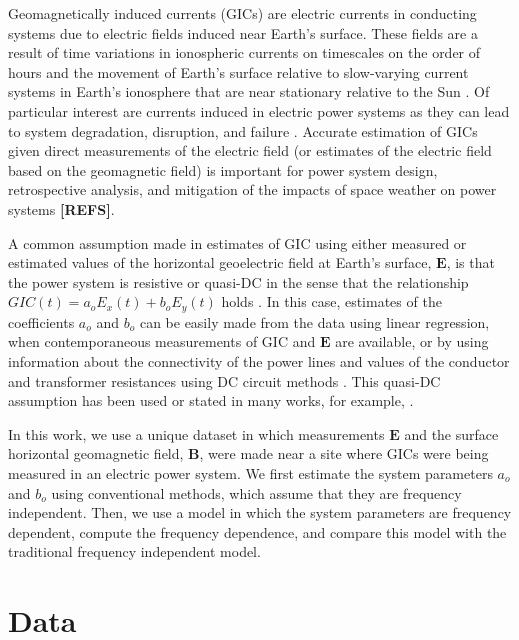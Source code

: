\documentclass[draft,linenumbers]{agujournal2018}
\begin{document}
Geomagnetically induced currents (GICs) are electric currents in conducting systems due to electric fields induced near Earth's surface. These fields are a result of time variations in ionospheric currents on timescales on the order of hours \citep{Ohtani2000} and the movement of Earth's surface relative to slow-varying current systems in Earth's ionosphere that are near stationary relative to the Sun \citep{Stening2013}. Of particular interest are currents induced in electric power systems as they can lead to system degradation, disruption, and failure \citep{Albertson1993,NERC2012}. Accurate estimation of GICs given direct measurements of the electric field (or estimates of the electric field based on the geomagnetic field) is important for power system design, retrospective analysis, and mitigation of the impacts of space weather on power systems  {\color{red} \textbf{[REFS]}}.

A common assumption made in estimates of GIC using either measured or estimated values of the horizontal geoelectric field at Earth's surface, $\mathbf{E}$, is that the power system is resistive or quasi-DC in the sense that the relationship $GIC(t) = a_oE_x(t) + b_oE_y(t)$ holds \citep{Albertson1981,Lehtinen1985}. In this case, estimates of the coefficients $a_o$ and $b_o$ can be easily made from the data using linear regression, when contemporaneous measurements of GIC and $\mathbf{E}$ are available, or by using information about the connectivity of the power lines and values of the conductor and transformer resistances using DC circuit methods \citep[e.g.][]{Boteler2014a,Boteler2014b}. This quasi-DC assumption has been used or stated in many works, for example, \citet{Pulkkinen2007,Wik2008,Pulkkinen2010,Ngwira2011,Viljanen2012,Overbye2012}.

In this work, we use a unique dataset in which measurements $\mathbf{E}$ and the surface horizontal geomagnetic field, $\mathbf{B}$, were made near a site where GICs were being measured in an electric power system.  We first estimate the system parameters $a_o$ and $b_o$ using conventional methods, which assume that they are frequency independent.  Then, we use a model in which the system parameters are frequency dependent, compute the frequency dependence, and compare this model with the traditional frequency independent model. 

\section{Data}
\end{document}
